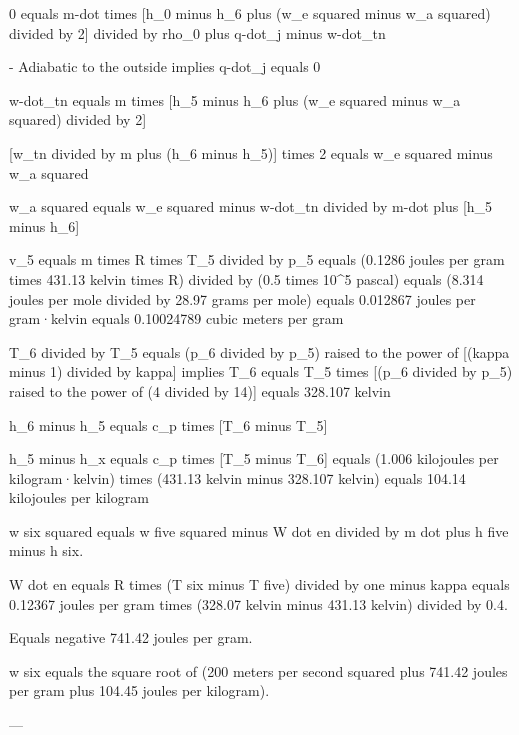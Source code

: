 0 equals m-dot times [h_0 minus h_6 plus (w_e squared minus w_a squared) divided by 2] divided by rho_0 plus q-dot_j minus w-dot_tn  

- Adiabatic to the outside implies q-dot_j equals 0  

w-dot_tn equals m times [h_5 minus h_6 plus (w_e squared minus w_a squared) divided by 2]  

[w_tn divided by m plus (h_6 minus h_5)] times 2 equals w_e squared minus w_a squared  

w_a squared equals w_e squared minus w-dot_tn divided by m-dot plus [h_5 minus h_6]  

v_5 equals m times R times T_5 divided by p_5  
equals (0.1286 joules per gram times 431.13 kelvin times R) divided by (0.5 times 10^5 pascal)  
equals (8.314 joules per mole divided by 28.97 grams per mole)  
equals 0.012867 joules per gram·kelvin  
equals 0.10024789 cubic meters per gram  

T_6 divided by T_5 equals (p_6 divided by p_5) raised to the power of [(kappa minus 1) divided by kappa]  
implies T_6 equals T_5 times [(p_6 divided by p_5) raised to the power of (4 divided by 14)]  
equals 328.107 kelvin  

h_6 minus h_5 equals c_p times [T_6 minus T_5]  

h_5 minus h_x equals c_p times [T_5 minus T_6]  
equals (1.006 kilojoules per kilogram·kelvin) times (431.13 kelvin minus 328.107 kelvin)  
equals 104.14 kilojoules per kilogram

w six squared equals w five squared minus W dot en divided by m dot plus h five minus h six.  

W dot en equals R times (T six minus T five) divided by one minus kappa equals 0.12367 joules per gram times (328.07 kelvin minus 431.13 kelvin) divided by 0.4.  

Equals negative 741.42 joules per gram.  

w six equals the square root of (200 meters per second squared plus 741.42 joules per gram plus 104.45 joules per kilogram).  

---
